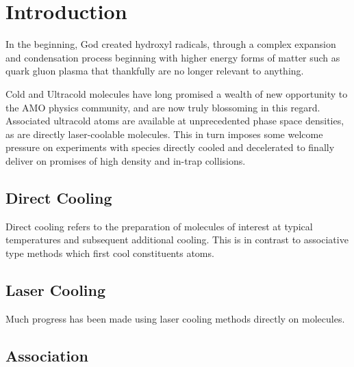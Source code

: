 \ifx\justbeingincluded\undefined


\fi

\chapter{Introduction}
\label{iii}

In the beginning, God created hydroxyl radicals, through a complex expansion and condensation process beginning with higher energy forms of matter such as quark gluon plasma that thankfully are no longer relevant to anything.

Cold and Ultracold molecules have long promised a wealth of new opportunity to the AMO physics community, and are now truly blossoming in this regard. Associated ultracold atoms are available at unprecedented phase space densities, as are directly laser-coolable molecules. This in turn imposes some welcome pressure on experiments with species directly cooled and decelerated to finally deliver on promises of high density and in-trap collisions.

\section{Direct Cooling}

Direct cooling refers to the preparation of molecules of interest at typical temperatures and subsequent additional cooling. This is in contrast to associative type methods which first cool constituents atoms.

\section{Laser Cooling}

Much progress has been made using laser cooling methods directly on molecules.

\section{Association}




\ifx\justbeingincluded\undefined

\fi

